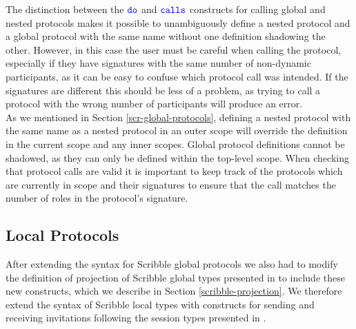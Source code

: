 \documentclass[12pt,twoside]{report}
\begin{document}
The distinction between the ${\color{blue}\mathtt{do}}$ and ${\color{blue}\mathtt{calls}}$ constructs for calling global and nested protocols makes it possible to unambiguously define a nested protocol and a global protocol with the same name without one definition shadowing the other. However, in this case the user must be careful when calling the protocol, especially if they have signatures with the same number of non-dynamic participants, as it can be easy to confuse which protocol call was intended. If the signatures are different this should be less of a problem, as trying to call a protocol with the wrong number of participants will produce an error.\\

As we mentioned in Section \ref{scr-global-protocols}, defining a nested protocol with the same name as a nested protocol in an outer scope will override the definition in the current scope and any inner scopes. Global protocol definitions cannot be shadowed, as they can only be defined within the top-level scope. When checking that protocol calls are valid it is important to keep track of the protocols which are currently in scope and their signatures to ensure that the call matches the number of roles in the protocol's signature. 

\subsection{Local Protocols}

After extending the syntax for Scribble global protocols we also had to modify the definition of projection of Scribble global types presented in \cite{featherweight} to include these new constructs, which we describe in Section \ref{scribble-projection}. We therefore extend the syntax of Scribble local types with constructs for sending and receiving invitations following the session types presented in \cite{nestedprotocols}. \\

        
    
    
\end{document}
